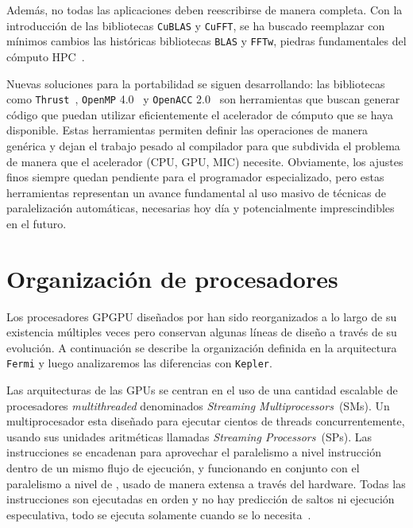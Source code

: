 Adem\'as, no todas las aplicaciones deben reescribirse de manera completa.
Con la introducci\'on de las bibliotecas \texttt{CuBLAS} y \texttt{CuFFT}, se ha buscado reemplazar con m\'inimos cambios las hist\'oricas bibliotecas \texttt{BLAS} y \texttt{FFTw}, piedras fundamentales del c\'omputo HPC~\cite{cublas,cufft}.

Nuevas soluciones para la portabilidad se siguen desarrollando: las bibliotecas como \texttt{Thrust}~\cite{thrust}, \texttt{OpenMP} 4.0~\cite{OpenMPSpec} y \texttt{OpenACC} 2.0~\cite{OpenACCSpec} son herramientas que buscan generar c\'odigo que puedan utilizar eficientemente el acelerador de c\'omputo que se haya disponible.
Estas herramientas permiten definir las operaciones de manera gen\'erica y dejan el trabajo pesado al compilador para que subdivida el problema de manera que el acelerador (CPU, GPU, MIC) necesite.
Obviamente, los ajustes finos siempre quedan pendiente para el programador especializado, pero estas herramientas representan un avance fundamental al uso masivo de t\'ecnicas de paralelizaci\'on autom\'aticas, necesarias hoy d\'ia y potencialmente imprescindibles en el futuro.

\section{Organizaci\'on de procesadores}

Los procesadores GPGPU dise\~nados por \nvidia{} han sido reorganizados a lo largo de su existencia m\'ultiples veces pero conservan algunas l\'ineas de dise\~no a trav\'es de su evoluci\'on.
A continuaci\'on se describe la organizaci\'on definida en la arquitectura \texttt{Fermi} y luego analizaremos las diferencias con \texttt{Kepler}.

Las arquitecturas de las GPUs se centran en el uso de una cantidad escalable de procesadores \textit{multithreaded} denominados \textit{Streaming Multiprocessors}~(SMs).
Un multiprocesador esta dise\~nado para ejecutar cientos de threads concurrentemente, usando sus unidades aritm\'eticas llamadas \textit{Streaming Processors}~(SPs).
Las instrucciones se encadenan para aprovechar el paralelismo a nivel instrucci\'on dentro de un mismo flujo de ejecuci\'on, y funcionando en conjunto con el paralelismo
a nivel de \thread{}, usado de manera extensa a trav\'es del hardware.
Todas las instrucciones son ejecutadas en orden y no hay predicci\'on de saltos ni ejecuci\'on especulativa, todo se ejecuta solamente cuando se lo necesita~\cite{CudaOverview}.

